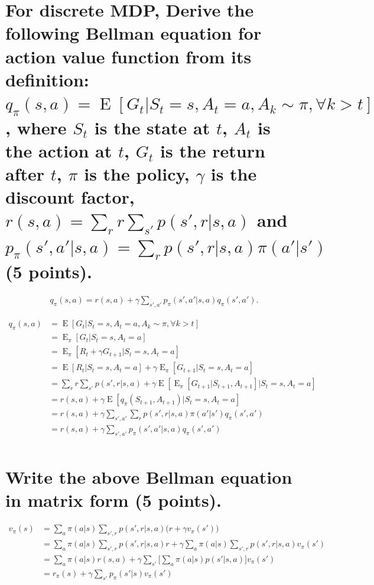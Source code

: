 \documentclass[twoside]{article}
\newcommand{\on}{\operatorname}
\newcommand{\E}{\on{E} }
\begin{document}
\newpage
\section{\normalsize 
For discrete MDP, Derive the following Bellman equation for action value function from its definition: $q_\pi(s,a) = \E\left[ G_t | S_t = s, A_t = a, A_k \sim \pi, \forall k > t \right]$, where $S_t$ is the state at $t$, $A_t$ is the action at $t$, $G_t$ is the return after $t$, $\pi$ is the policy, $\gamma$ is the discount factor, $r(s,a) = \sum_r r  \sum_{s'} p(s', r | s, a)$ and $p_\pi(s', a'|s, a) = \sum_r p(s', r| s, a)\pi(a'|s')$
 (5 points).
}
\begin{align}
q_\pi(s, a) = r(s, a) + \gamma \sum_{s', a'} p_\pi(s', a'|s, a) q_\pi(s', a').
\end{align}

\begin{align*}
	q_\pi(s,a) &= \E\left[ G_t | S_t = s, A_t = a, A_k \sim \pi, \forall k > t \right]\\
	&=\E_{\pi}\left[ G_t | S_t = s, A_t = a \right]\\
	&=\E_{\pi}\left[ R_t+\gamma G_{t+1} | S_t = s, A_t = a \right]\\
	&=\E\left[ R_t | S_t = s, A_t = a \right] +\gamma\E_{\pi}\left[ G_{t+1} | S_t = s, A_t = a \right]\\
	&=\sum_r r  \sum_{s'} p(s', r | s, a) + \gamma\E\left[ \E_{\pi}\left[G_{t+1}|S_{t+1}, A_{t+1}\right] | S_t = s, A_t = a \right]\\
	&=r(s,a) + \gamma\E\left[ q_\pi(S_{t+1}, A_{t+1})| S_t = s, A_t = a \right]\\
	&=r(s,a) + \gamma\sum_{s',a'}\sum_r p(s', r| s, a)\pi(a'|s')q_\pi(s',a')\\
	&=r(s,a) + \gamma\sum_{s',a'}p_\pi(s', a'|s, a)q_\pi(s',a')\\
\end{align*}


\section{\normalsize 
Write the above Bellman equation in matrix form
 (5 points).
}

\begin{align*}
	v_{\pi}(s) &= \sum_{a}{\pi(a|s)\sum_{s',r}{p(s',r|s,a)\big(r + \gamma v_{\pi}(s')\big)}}\\
	&= \sum_{a}{\pi(a|s)\sum_{s',r}{p(s',r|s,a)r}} + \gamma\sum_{a}{\pi(a|s)\sum_{s',r}{p(s',r|s,a)v_{\pi}(s')}}\\
	&= \sum_{a}{\pi(a|s)r(s,a)} + \gamma\sum_{s'}{\Big[\sum_{a}{\pi(a|s)p(s'|s,a)}\Big]v_{\pi}(s')}\\
	&= r_{\pi}(s) + \gamma \sum_{s'}{p_{\pi}(s'|s)v_{\pi}(s')}
\end{align*}
\end{document}
